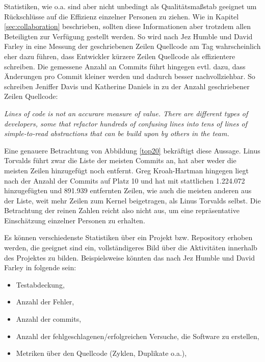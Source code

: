 Statistiken, wie o.a. sind aber nicht unbedingt als Qualitätsmaßstab geeignet um
Rückschlüsse auf die Effizienz einzelner Personen zu ziehen. Wie in Kapitel
\ref{sec:collaboration} beschrieben, sollten diese Informationen aber trotzdem
allen Beteiligten zur Verfügung gestellt werden.  So wird nach Jez Humble und
David Farley in \cite[S.~138]{cd} eine Messung der geschriebenen Zeilen
Quellcode am Tag wahrscheinlich eher dazu führen, dass Entwickler kürzere Zeilen
Quellcode als effizientere schreiben. Die gemessene Anzahl an Commits führt hingegen
evtl. dazu, dass Änderungen pro Commit kleiner werden und dadurch besser
nachvollziehbar. So schreiben Jeniffer Davis und Katherine Daniels in
\cite[S.~179]{effdo} zu der Anzahl geschriebener Zeilen Quellcode:
\begin{center}
\textit{\glqq{}Lines of code is not an accurare measure of value. There are
different types of developers, some that refactor hundreds of confusing lines
into tens of lines of simple-to-read abstractions that can be build upon by
others in the team.\grqq{}}
\end{center}

Eine genauere Betrachtung von Abbildung \ref{top20} bekräftigt diese Aussage.
Linus Torvalds führt zwar die Liste der meisten Commits an, hat aber weder die
meisten Zeilen hinzugefügt noch entfernt. Greg Kroah-Hartman hingegen liegt
nach der Anzahl der Commits auf Platz 10 und hat mit stattlichen 1.224.072
hinzugefügten und 891.939 entfernten Zeilen, wie auch die meisten anderen aus
der Liste, weit mehr Zeilen zum Kernel beigetragen, als Linus Torvalds selbst.
Die Betrachtung der reinen Zahlen reicht also nicht aus, um eine repräsentative
Einschätzung einzelner Personen zu erhalten.

Es können verschiedenste Statistiken über ein Projekt bzw. Repository erhoben
werden, die geeignet sind ein, vollständigeres Bild über die Aktivitäten
innerhalb des Projektes zu bilden. Beispielsweise könnten das nach Jez Humble
und David Farley in \cite[S.~138]{cd}folgende sein:

\begin{itemize}
\item Testabdeckung,
\item Anzahl der Fehler,
\item Anzahl der \glspl{commit},
\item Anzahl der fehlgeschlagenen/erfolgreichen Versuche, die Software zu erstellen,
\item Metriken über den Quellcode (Zyklen, Duplikate o.a.),
\end{itemize}

